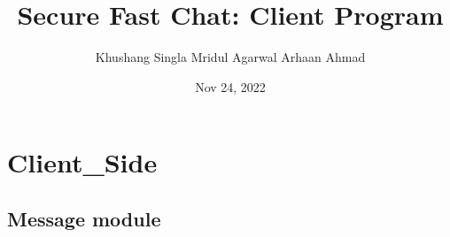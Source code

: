 \documentclass[letterpaper,10pt,english]{sphinxmanual}
\title{Secure Fast Chat: Client Program}
\date{Nov 24, 2022}
\author{Khushang Singla	Mridul Agarwal	Arhaan Ahmad}
\begin{document}
\pagestyle{empty}
\sphinxmaketitle
\pagestyle{plain}
\sphinxtableofcontents
\pagestyle{normal}
\label{\detokenize{index::doc}}



\chapter{Client\_Side}
\label{\detokenize{modules:client-side}}\label{\detokenize{modules::doc}}

\section{Message module}
\label{\detokenize{Message:module-Message}}\label{\detokenize{Message:message-module}}\label{\detokenize{Message::doc}}
\end{document}
